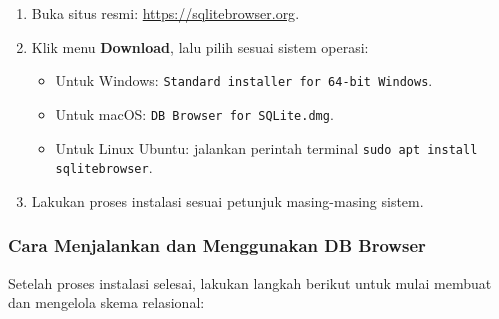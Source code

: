 \begin{enumerate}
	\item Buka situs resmi: \url{https://sqlitebrowser.org}.
	\item Klik menu \textbf{Download}, lalu pilih sesuai sistem operasi:
	\begin{itemize}
		\item Untuk Windows: \texttt{Standard installer for 64-bit Windows}.
		\item Untuk macOS: \texttt{DB Browser for SQLite.dmg}.
		\item Untuk Linux Ubuntu: jalankan perintah terminal \texttt{sudo apt install sqlitebrowser}.
	\end{itemize}
	\item Lakukan proses instalasi sesuai petunjuk masing-masing sistem.
\end{enumerate}

\subsubsection{Cara Menjalankan dan Menggunakan DB Browser}

Setelah proses instalasi selesai, lakukan langkah berikut untuk mulai membuat dan mengelola skema relasional:

